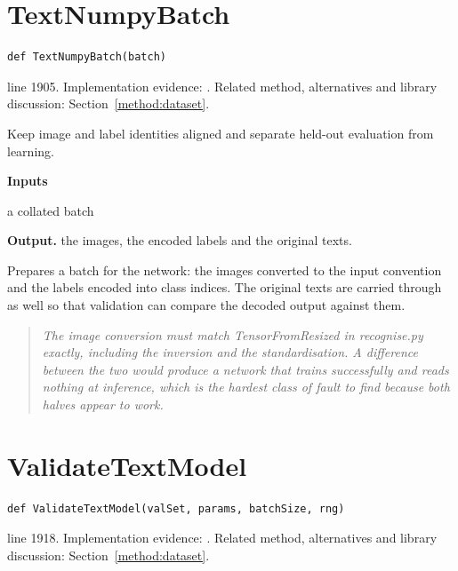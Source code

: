 \section{TextNumpyBatch}\label{fn:train:TextNumpyBatch}
\begin{lstlisting}[style=sig]
def TextNumpyBatch(batch)
\end{lstlisting}
 line 1905. Implementation evidence: \cite{code2026}. Related method, alternatives and library discussion: Section~\ref{method:dataset}.


Keep image and label identities aligned and separate held-out evaluation from learning.




\noindent\textbf{Inputs}
\begin{description}[leftmargin=2.2em,style=nextline,font=\normalfont\ttfamily]\setlength\itemsep{1pt}
  \item[{batch}] \normalfont a collated batch
\end{description}

\noindent\textbf{Output.} the images, the encoded labels and the original texts.


Prepares a batch for the network: the images converted to the input convention and the labels encoded into class indices. The original texts are carried through as well so that validation can compare the decoded output against them.


\begin{quote}\small\itshape The image conversion must match TensorFromResized in recognise.py exactly, including the inversion and the standardisation. A difference between the two would produce a network that trains successfully and reads nothing at inference, which is the hardest class of fault to find because both halves appear to work.\end{quote}


\section{ValidateTextModel}\label{fn:train:ValidateTextModel}
\begin{lstlisting}[style=sig]
def ValidateTextModel(valSet, params, batchSize, rng)
\end{lstlisting}
 line 1918. Implementation evidence: \cite{code2026}. Related method, alternatives and library discussion: Section~\ref{method:dataset}.


